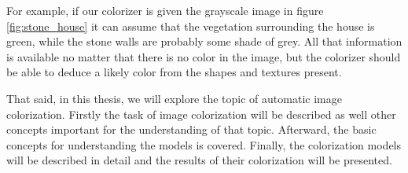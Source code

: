 For example, if our colorizer is given the grayscale image in figure 
\ref{fig:stone_house} it can assume that the vegetation surrounding the 
house is green, while the stone walls are probably some shade of grey. 
All that information is available no matter that there is no color 
in the image, but the colorizer should be able to deduce a likely color from the 
shapes and textures present. 

That said, in this thesis, we will explore the topic of automatic image 
colorization. Firstly the task of image colorization will be described as well 
other concepts important for the understanding of that topic. Afterward, the
basic concepts for understanding the models is covered. Finally, the colorization 
models will be described in detail and the results of their colorization will be
presented.